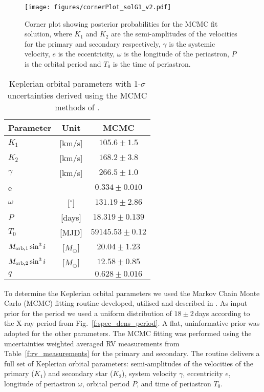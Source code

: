 \documentclass[fleqn,usenatbib]{mnras}
\begin{document}
\begin{figure*}
	\texttt{[image: figures/cornerPlot\_solG1\_v2.pdf]}
    \caption{Corner plot showing posterior probabilities for the MCMC fit solution, where $K_1$ and $K_2$ are the semi-amplitudes of the velocities for the primary and secondary respectively, $\gamma$ is the systemic velocity, $e$ is the eccentricity, $\omega$ is the longitude of the periastron, $P$ is the orbital period and $T_0$ is the time of periastron.}
    \label{f:corner_plot}
\end{figure*}

\begin{table}
	\centering
	\caption{Keplerian orbital parameters with 1-$\sigma$ uncertainties derived using the MCMC methods of \citet{tehrani2019}.}
	\label{t:orbit_param}
	\begin{tabular}{lcc} %
		\hline
		Parameter & Unit & MCMC\\%
		\hline
		$K_1$ 		& [km/s]	& $105.6\pm1.5$		\\
		$K_2$ 		& [km/s]	& $168.2\pm 3.8$	\\
		$\gamma$ 	& [km/s] 	& $266.5\pm 1.0$	\\
		e 			&			& $0.334\pm0.010$		\\
		$\omega$	& [$^{\circ}$]		& $131.19\pm2.86$	\\
		$P$			& [days]	& $18.319\pm0.139$	\\
		$T_0$		& [MJD]	& $59145.53\pm0.12$	\\
		$M_{\rm orb,1} \sin^3 i$ & [$M_{\odot}$]	& $20.04\pm1.23$	\\
		$M_{\rm orb,2} \sin^3 i$ & [$M_{\odot}$]	& $12.58\pm0.85$	\\
		$q$			&			&	$0.628\pm 0.016$\\
		\hline
	\end{tabular}
\end{table}

To determine the Keplerian orbital parameters we used the Markov Chain Monte Carlo (MCMC) fitting routine developed, utilised and described in \cite{tehrani2019}. As input prior for the period we used a uniform distribution of $18 \pm 2$\,days according to the X-ray period from Fig.~\ref{f:spec_dens_period}. A flat, uninformative prior was adopted for the other parameters. The MCMC fitting was performed using the uncertainties weighted averaged RV measurements from Table~\ref{f:rv_measurements} for the primary and secondary. The routine delivers a full set of Keplerian orbital parameters: semi-amplitudes of the velocities of the primary ($K_1$) and secondary star ($K_2$), system velocity $\gamma$, eccentricity $e$, longitude of periastron $\omega$, orbital period $P$, and time of periastron $T_0$.
\end{document}
